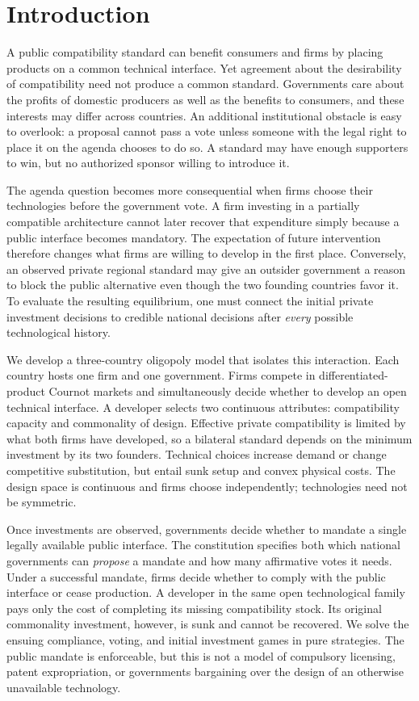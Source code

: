 \section{Introduction}\label{sec:introduction}

A public compatibility standard can benefit consumers and firms by placing products on a common technical interface. Yet agreement about the desirability of compatibility need not produce a common standard. Governments care about the profits of domestic producers as well as the benefits to consumers, and these interests may differ across countries. An additional institutional obstacle is easy to overlook: a proposal cannot pass a vote unless someone with the legal right to place it on the agenda chooses to do so. A standard may have enough supporters to win, but no authorized sponsor willing to introduce it.

The agenda question becomes more consequential when firms choose their technologies before the government vote. A firm investing in a partially compatible architecture cannot later recover that expenditure simply because a public interface becomes mandatory. The expectation of future intervention therefore changes what firms are willing to develop in the first place. Conversely, an observed private regional standard may give an outsider government a reason to block the public alternative even though the two founding countries favor it. To evaluate the resulting equilibrium, one must connect the initial private investment decisions to credible national decisions after \emph{every} possible technological history.

We develop a three-country oligopoly model that isolates this interaction. Each country hosts one firm and one government. Firms compete in differentiated-product Cournot markets and simultaneously decide whether to develop an open technical interface. A developer selects two continuous attributes: compatibility capacity and commonality of design. Effective private compatibility is limited by what both firms have developed, so a bilateral standard depends on the minimum investment by its two founders. Technical choices increase demand or change competitive substitution, but entail sunk setup and convex physical costs. The design space is continuous and firms choose independently; technologies need not be symmetric.

Once investments are observed, governments decide whether to mandate a single legally available public interface. The constitution specifies both which national governments can \emph{propose} a mandate and how many affirmative votes it needs. Under a successful mandate, firms decide whether to comply with the public interface or cease production. A developer in the same open technological family pays only the cost of completing its missing compatibility stock. Its original commonality investment, however, is sunk and cannot be recovered. We solve the ensuing compliance, voting, and initial investment games in pure strategies. The public mandate is enforceable, but this is not a model of compulsory licensing, patent expropriation, or governments bargaining over the design of an otherwise unavailable technology.

